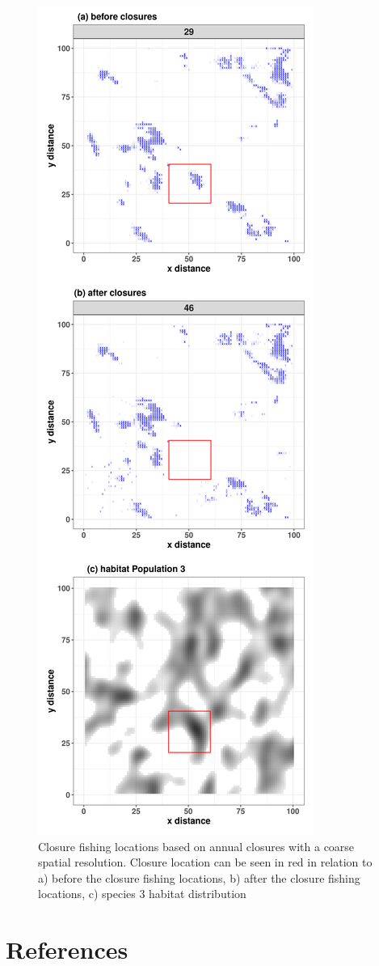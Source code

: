 \documentclass[review]{elsarticle}
\begin{document}
\begin{figure}[!ht]
	\centering
	\includegraphics[width =0.5\linewidth]{./Plots/Closure_fishing_locations_yearly}
	\caption{Closure fishing locations based on annual closures with a
		coarse spatial resolution. Closure location can be seen in red
	in relation to a) before the closure fishing locations, b) after the
	closure fishing locations, c) species 3 habitat distribution}
	\label{fig:17}
\end{figure}	

\clearpage

\section*{References}


\end{document}
